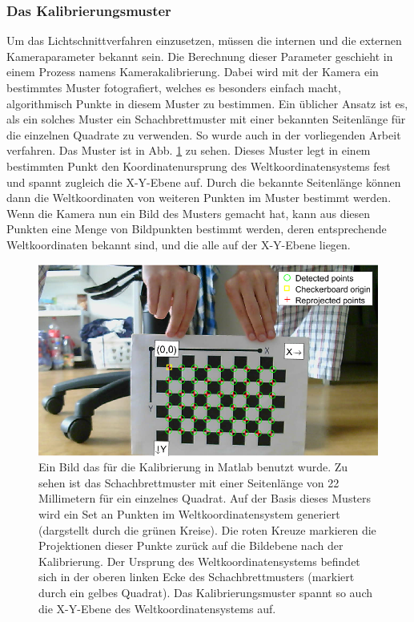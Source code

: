\subsubsection{Das Kalibrierungsmuster}
Um das Lichtschnittverfahren einzusetzen, müssen die internen und die externen Kameraparameter bekannt sein. Die Berechnung dieser Parameter geschieht in einem Prozess namens Kamerakalibrierung. Dabei wird mit der Kamera ein bestimmtes Muster fotografiert, welches es besonders einfach macht, algorithmisch Punkte in diesem Muster zu bestimmen. Ein üblicher Ansatz ist es, als ein solches Muster ein Schachbrettmuster mit einer bekannten Seitenlänge für die einzelnen Quadrate zu verwenden. So wurde auch in der vorliegenden Arbeit verfahren. Das Muster ist in Abb. \ref{fig:Calibration} zu sehen. Dieses Muster legt in einem bestimmten Punkt den Koordinatenursprung des Weltkoordinatensystems fest und spannt zugleich die X-Y-Ebene auf. Durch die bekannte Seitenlänge können dann die Weltkoordinaten von weiteren Punkten im Muster bestimmt werden. Wenn die Kamera nun ein Bild des Musters gemacht hat, kann aus diesen Punkten eine Menge von Bildpunkten bestimmt werden, deren entsprechende Weltkoordinaten bekannt sind, und die alle auf der X-Y-Ebene liegen.

\begin{figure}
\includegraphics[width=\textwidth]{images/Calibration.png}
\caption{Ein Bild das für die Kalibrierung in Matlab benutzt wurde. Zu sehen ist das Schachbrettmuster mit einer Seitenlänge von 22 Millimetern für ein einzelnes Quadrat. Auf der Basis dieses Musters wird ein Set an Punkten im Weltkoordinatensystem generiert (dargstellt durch die grünen Kreise). Die roten Kreuze markieren die Projektionen dieser Punkte zurück auf die Bildebene nach der Kalibrierung. Der Ursprung des Weltkoordinatensystems befindet sich in der oberen linken Ecke des Schachbrettmusters (markiert durch ein gelbes Quadrat). Das Kalibrierungsmuster spannt so auch die X-Y-Ebene des Weltkoordinatensystems auf. }\label{fig:Calibration}
\end{figure}
 
